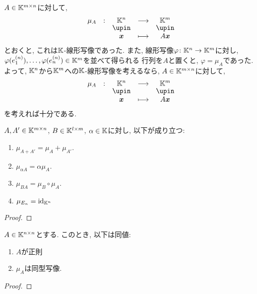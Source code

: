 
$A\in\mathbb{K}^{m\times n}$に対して,
\begin{align*}
  \shazo{\mu_A}{\KK^n}{\KK^m}
        {\xx}
        {A\xx}
\end{align*}
とおくと, これは$\mathbb{K}$-線形写像であった.
また, 線形写像$\varphi\colon \mathbb{K}^n\to \mathbb{K}^m$に対し,
$\varphi(e^{(n)}_1),\ldots,\varphi(e^{(n)}_n)\in\mathbb{K}^m$を並べて得られる
行列を$A$と置くと,
$\varphi=\mu_A$であった.
よって, 
$\mathbb{K}^n$から$\mathbb{K}^m$への$\mathbb{K}$-線形写像を考えるなら,
$A\in\mathbb{K}^{m\times n}$に対して,
\begin{align*}
  \shazo{\mu_A}{\KK^n}{\KK^m}
        {\xx}
        {A\xx}
\end{align*}
を考えれば十分である.

\begin{prop}
\label{prop:hom:mat:mor}
  $A,A'\in \mathbb{K}^{m\times n}$,
  $B\in\mathbb{K}^{l\times m}$,
  $\alpha \in\mathbb{K}$に対し, 以下が成り立つ:
  \begin{enumerate}
  \item $\mu_{A+A'}=\mu_A+\mu_{A'}$.
  \item $\mu_{\alpha A}=\alpha\mu_A$.
  \item $\mu_{BA}=\mu_B\circ\mu_{A}$.
  \item $\mu_{E_n}=\operatorname{id}_{\mathbb{K}^n}$
  \end{enumerate}
\end{prop}
\begin{proof}\end{proof}

\begin{cor}
  $A\in \mathbb{K}^{n\times n}$とする.
  このとき,
  以下は同値:
  \begin{enumerate}
  \item $A$が正則
  \item $\mu_A$は同型写像.
  \end{enumerate}
\end{cor}
\begin{proof}\end{proof}


